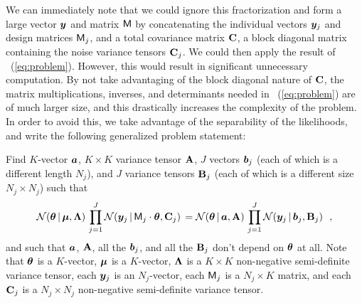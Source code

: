 We can immediately note that we could ignore this fractorization and form a large  vector $\boldsymbol{y}$ and matrix $\mathsf{M}$ by concatenating the individual vectors $\boldsymbol{y}_j$ and design matrices $\mathsf{M}_j$, and a total covariance matrix $\mathbf{C}$, a block diagonal matrix containing the noise variance tensors $\mathbf{C}_j$.
We could then apply the result of \equationname~(\ref{eq:problem}).
However, this would result in significant unnecessary computation. By not take advantaging of the block diagonal nature of $\mathbf{C}$, the matrix multiplications, inverses, and determinants needed in \equationname~(\ref{eq:problem}) are of much larger size, and this drastically increases the complexity of the problem.
In order to avoid this, we take advantage of the separability of the likelihoods, and write the following generalized problem statement:

Find $K$-vector $\boldsymbol{a}$, $K\times K$ variance tensor $\mathbf{A}$, $J$ vectors $\boldsymbol{b}_j$ (each
of which is a different length $N_j$),
and $J$ variance tensors $\mathbf{B}_j$ (each of which is a different size $N_j\times N_j$)
such that
\begin{equation}\label{eq:genproblem}
\mathcal{N}\!\,(\boldsymbol{\theta}\,|\,\boldsymbol{\mu},\mathbf{\Lambda})\,\prod_{j=1}^J\mathcal{N}\!\,(\boldsymbol{y}_j\,|\,\mathsf{M}_j\cdot\boldsymbol{\theta},\mathbf{C}_j)\,
 = \mathcal{N}\!\,(\boldsymbol{\theta}\,|\,\boldsymbol{a},\mathbf{A})\,\prod_{j=1}^J\mathcal{N}\!\,(\boldsymbol{y}_j\,|\,\boldsymbol{b}_j,\mathbf{B}_j) ~~,
\end{equation}
and such that $\boldsymbol{a}$, $\mathbf{A}$, all the $\boldsymbol{b}_j$, and all the $\mathbf{B}_j$
don't depend on $\boldsymbol{\theta}$ at all.
Note that
$\boldsymbol{\theta}$ is a $K$-vector,
$\boldsymbol{\mu}$ is a $K$-vector,
$\mathbf{\Lambda}$ is a $K\times K$ non-negative semi-definite variance tensor,
each $\boldsymbol{y}_j$ is an $N_j$-vector,
each $\mathsf{M}_j$ is a $N_j\times K$ matrix,
and
each $\mathbf{C}_j$ is a $N_j\times N_j$ non-negative semi-definite variance tensor.

